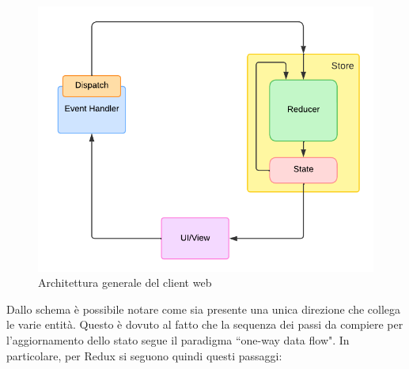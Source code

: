 \begin{figure}[htb]
	\centering
	\includegraphics[scale=0.8]{imgs/Redux_Scheme.pdf}
	\caption{Architettura generale del client web}
	\label{fig:redux-scheme}
\end{figure}
Dallo schema è possibile notare come sia presente una unica direzione che collega le varie entità. Questo è dovuto al fatto che la sequenza dei passi da compiere per l'aggiornamento dello stato segue il paradigma ``one-way data flow". In particolare, per Redux si seguono quindi questi passaggi:

